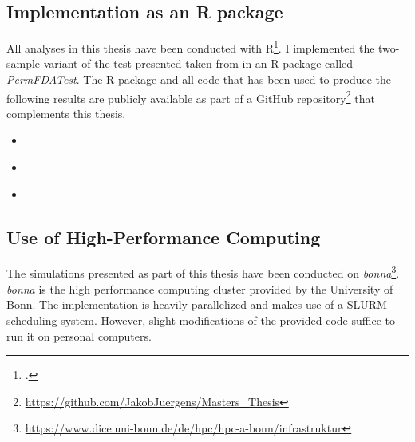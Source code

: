 \documentclass[12pt, a4paper]{article}
\theoremstyle{MAstyle} \newtheorem{assumption}{Assumption}[section]
\theoremstyle{MAstyle} \newtheorem{definition}{Definition}[section]
\begin{document}
		\subsection{Implementation as an R package}
			All analyses in this thesis have been conducted with R\footcite{R}. I implemented the two-sample variant of the test presented taken from \cite{bugni_permutation_2021} in an R package called \textit{PermFDATest}. The R package and all code that has been used to produce the following results are publicly available as part of a GitHub repository\footnote{\href{https://github.com/JakobJuergens/Masters_Thesis}{https://github.com/JakobJuergens/Masters\_Thesis}} that complements this thesis.
			
			\begin{itemize}
				\item \cite{fda}
				\item \cite{tidyverse}
				\item \cite{refund}
			\end{itemize}
			
		\subsection{Use of High-Performance Computing}
			The simulations presented as part of this thesis have been conducted on \textit{bonna}\footnote{\href{https://www.dice.uni-bonn.de/de/hpc/hpc-a-bonn/infrastruktur}{https://www.dice.uni-bonn.de/de/hpc/hpc-a-bonn/infrastruktur}}. \textit{bonna} is the high performance computing cluster provided by the University of Bonn. The implementation is heavily parallelized and makes use of a SLURM scheduling system. However, slight modifications of the provided code suffice to run it on personal computers.
\end{document}
